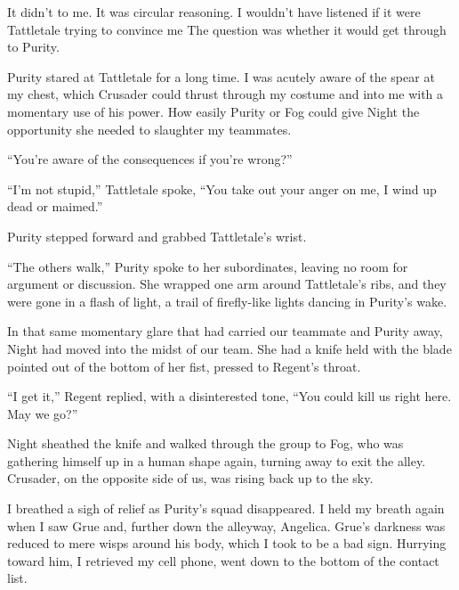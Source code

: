 It didn't to me.  It was circular reasoning.  I wouldn't have listened if it were Tattletale trying to convince me  The question was whether it would get through to Purity.



Purity stared at Tattletale for a long time.  I was acutely aware of the spear at my chest, which Crusader could thrust through my costume and into me with a momentary use of his power.  How easily Purity or Fog could give Night the opportunity she needed to slaughter my teammates.



``You're aware of the consequences if you're wrong?''



``I'm not stupid,'' Tattletale spoke, ``You take out your anger on me, I wind up dead or maimed.''



Purity stepped forward and grabbed Tattletale's wrist.



``The others walk,'' Purity spoke to her subordinates, leaving no room for argument or discussion.  She wrapped one arm around Tattletale's ribs, and they were gone in a flash of light, a trail of firefly-like lights dancing in Purity's wake.



In that same momentary glare that had carried our teammate and Purity away, Night had moved into the midst of our team.  She had a knife held with the blade pointed out of the bottom of her fist, pressed to Regent's throat.



``I get it,'' Regent replied, with a disinterested tone, ``You could kill us right here.  May we go?''



Night sheathed the knife and walked through the group to Fog, who was gathering himself up in a human shape again, turning away to exit the alley.  Crusader, on the opposite side of us, was rising back up to the sky.



I breathed a sigh of relief as Purity's squad disappeared.  I held my breath again when I saw Grue and, further down the alleyway, Angelica.  Grue's darkness was reduced to mere wisps around his body, which I took to be a bad sign.  Hurrying toward him, I retrieved my cell phone, went down to the bottom of the contact list.



